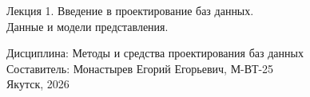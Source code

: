 \documentclass[aspectratio=169]{beamer}
\begin{document}
\begin{frame}[plain]
  \vspace*{1cm}
  \begin{center}
    
    \colorbox{svfuDark}{%
      \parbox[c][2.8cm][c]{0.86\paperwidth}{%
        \centering
        {\LARGE\color{white}
          Лекция 1. Введение в проектирование баз данных. \\ Данные и модели представления.
        }
      }%
    }

  \end{center}

  \vfill

  \centering
  {\normalsize Дисциплина: Методы и средства проектирования баз данных}\\[4pt]
 {\small
   Составитель: Монастырев Егорий Егорьевич, М-ВТ-25 
 }\\[4pt]

 

  {\small
    Якутск, 2026
  }

  \vfill

\end{frame}






\end{document}
